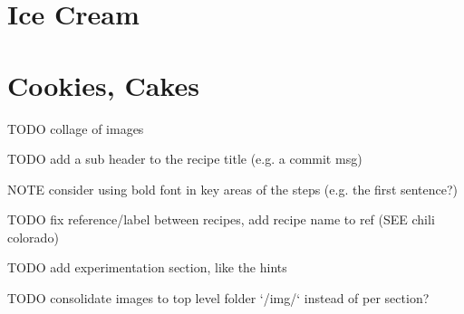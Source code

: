 \documentclass[]{article}
\begin{document}
\clearpage
\section{Ice Cream}
{

}

\clearpage
\section{Cookies, Cakes}
TODO collage of images

TODO add a sub header to the recipe title (e.g. a commit msg)

NOTE consider using bold font in key areas of the steps (e.g. the first sentence?)

TODO fix reference/label between recipes, add recipe name to ref (SEE chili colorado)

TODO add experimentation section, like the hints

TODO consolidate images to top level folder `/img/` instead of per section?






\printbibliography
\end{document}
